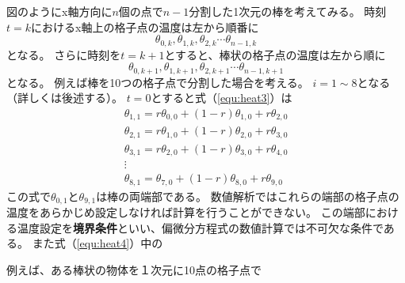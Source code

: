 \documentclass[]{ltjsbook}
\begin{document}
	図のようにx軸方向に$n$個の点で$n-1$分割した1次元の棒を考えてみる。
	時刻$t = k$におけるx軸上の格子点の温度は左から順番に
	\begin{equation}
		\theta_{0,k}, \theta_{1, k}, \theta_{2, k} \cdots \theta_{n-1, k}
	\end{equation}
	となる。
	さらに時刻を$t = k+1$とすると、棒状の格子点の温度は左から順に
	\begin{equation}
		\theta_{0,k+1}, \theta_{1, k+1}, \theta_{2, k+1} \cdots \theta_{n-1, k+1}
	\end{equation}
	となる。
	例えば棒を10つの格子点で分割した場合を考える。
	$i = 1 \sim 8$となる（詳しくは後述する）。
	$t = 0$とすると式（\ref{equ:heat3}）は
	\begin{equation}
		\begin{gathered}
		\theta_{1, 1} = r\theta_{0, 0} + (1-r)\theta_{1, 0} + r\theta_{2, 0}\\
		\theta_{2, 1} = r\theta_{1, 0} + (1-r)\theta_{2, 0} + r\theta_{3, 0}\\
		\theta_{3, 1} = r\theta_{2, 0} + (1-r)\theta_{3, 0} + r\theta_{4, 0}\\
		\vdots \\
		\theta_{8, 1} = \theta_{7, 0} + (1-r)\theta_{8, 0} + r\theta_{9, 0}
		\end{gathered}
		\label{equ:heat4}
	\end{equation}
	この式で$\theta_{0, 1}$と$\theta_{9, 1}$は棒の両端部である。
	数値解析ではこれらの端部の格子点の温度をあらかじめ設定しなければ計算を行うことができない。
	この端部における温度設定を\textbf{境界条件}といい、偏微分方程式の数値計算では不可欠な条件である。
	また式（\ref{equ:heat4}）中の
	
	例えば、ある棒状の物体を１次元に10点の格子点で
	
	
	
	
	

	


	
\end{document}
